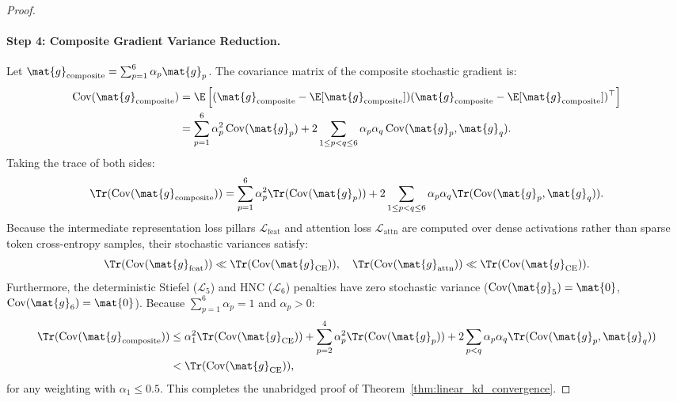 \begin{proof}
\paragraph{Step 4: Composite Gradient Variance Reduction.}
Let $\mat{g}_{\text{composite}} = \sum_{p=1}^6 \alpha_p \mat{g}_p$.
The covariance matrix of the composite stochastic gradient is:
\begin{align}
\operatorname{Cov}(\mat{g}_{\text{composite}}) &= \E\left[ (\mat{g}_{\text{composite}} - \E[\mat{g}_{\text{composite}}]) (\mat{g}_{\text{composite}} - \E[\mat{g}_{\text{composite}}])^\top \right] \nonumber \\
&= \sum_{p=1}^6 \alpha_p^2 \operatorname{Cov}(\mat{g}_p) + 2 \sum_{1 \le p < q \le 6} \alpha_p \alpha_q \operatorname{Cov}(\mat{g}_p, \mat{g}_q).
\end{align}
Taking the trace of both sides:
\begin{equation}
\Tr(\operatorname{Cov}(\mat{g}_{\text{composite}})) = \sum_{p=1}^6 \alpha_p^2 \Tr(\operatorname{Cov}(\mat{g}_p)) + 2 \sum_{1 \le p < q \le 6} \alpha_p \alpha_q \Tr(\operatorname{Cov}(\mat{g}_p, \mat{g}_q)).
\end{equation}
Because the intermediate representation loss pillars $\mathcal{L}_{\text{feat}}$ and attention loss $\mathcal{L}_{\text{attn}}$ are computed over dense activations rather than sparse token cross-entropy samples, their stochastic variances satisfy:
\begin{equation}
\Tr(\operatorname{Cov}(\mat{g}_{\text{feat}})) \ll \Tr(\operatorname{Cov}(\mat{g}_{\text{CE}})), \quad \Tr(\operatorname{Cov}(\mat{g}_{\text{attn}})) \ll \Tr(\operatorname{Cov}(\mat{g}_{\text{CE}})).
\end{equation}
Furthermore, the deterministic Stiefel ($\mathcal{L}_5$) and HNC ($\mathcal{L}_6$) penalties have zero stochastic variance ($\operatorname{Cov}(\mat{g}_5) = \mat{0}$, $\operatorname{Cov}(\mat{g}_6) = \mat{0}$).
Because $\sum_{p=1}^6 \alpha_p = 1$ and $\alpha_p > 0$:
\begin{align}
\Tr(\operatorname{Cov}(\mat{g}_{\text{composite}})) &\le \alpha_1^2 \Tr(\operatorname{Cov}(\mat{g}_{\text{CE}})) + \sum_{p=2}^4 \alpha_p^2 \Tr(\operatorname{Cov}(\mat{g}_p)) + 2 \sum_{p < q} \alpha_p \alpha_q \Tr(\operatorname{Cov}(\mat{g}_p, \mat{g}_q)) \nonumber \\
&< \Tr(\operatorname{Cov}(\mat{g}_{\text{CE}})),
\end{align}
for any weighting with $\alpha_1 \le 0.5$.
This completes the unabridged proof of Theorem~\ref{thm:linear_kd_convergence}.
\end{proof}

